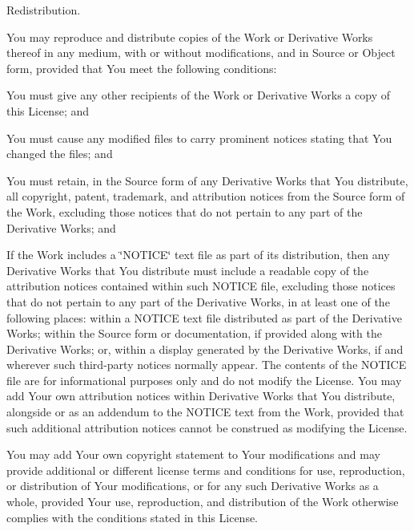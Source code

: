 \begin{DoxyEnumerate}
\item Redistribution.
\end{DoxyEnumerate}

You may reproduce and distribute copies of the Work or Derivative Works thereof in any medium, with or without modifications, and in Source or Object form, provided that You meet the following conditions\+:


\begin{DoxyEnumerate}
\item You must give any other recipients of the Work or Derivative Works a copy of this License; and
\item You must cause any modified files to carry prominent notices stating that You changed the files; and
\item You must retain, in the Source form of any Derivative Works that You distribute, all copyright, patent, trademark, and attribution notices from the Source form of the Work, excluding those notices that do not pertain to any part of the Derivative Works; and
\item If the Work includes a \char`\"{}\+N\+O\+T\+I\+C\+E\char`\"{} text file as part of its distribution, then any Derivative Works that You distribute must include a readable copy of the attribution notices contained within such N\+O\+T\+I\+CE file, excluding those notices that do not pertain to any part of the Derivative Works, in at least one of the following places\+: within a N\+O\+T\+I\+CE text file distributed as part of the Derivative Works; within the Source form or documentation, if provided along with the Derivative Works; or, within a display generated by the Derivative Works, if and wherever such third-\/party notices normally appear. The contents of the N\+O\+T\+I\+CE file are for informational purposes only and do not modify the License. You may add Your own attribution notices within Derivative Works that You distribute, alongside or as an addendum to the N\+O\+T\+I\+CE text from the Work, provided that such additional attribution notices cannot be construed as modifying the License.
\end{DoxyEnumerate}

You may add Your own copyright statement to Your modifications and may provide additional or different license terms and conditions for use, reproduction, or distribution of Your modifications, or for any such Derivative Works as a whole, provided Your use, reproduction, and distribution of the Work otherwise complies with the conditions stated in this License.


